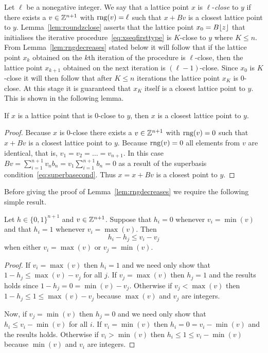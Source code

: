 \documentclass[final,leqno]{siamltex}
\begin{document}
Let $\ell$ be a nonegative integer.  We say that a lattice point $x$ is $\ell$-\emph{close} to $y$ if there exists a $v \in {\mathbb Z}^{n+1}$ with $\operatorname{rng}(v) = \ell$ such that $x + Bv$ is a closest lattice point to $y$.  Lemma~\ref{lem:roundzclose} asserts that the lattice point $x_0 = B{\left\lfloor z \right\rfloor}$ that initialises the iterative procedure~\eqref{eq:xseqfirsttype} is $K$-close to $y$ where $K \leq n$.  From Lemma~\ref{lem:rngdecreases} stated below it will follow that if the lattice point $x_k$ obtained on the $k$th iteration of the procedure is $\ell$-close, then the lattice point $x_{k+1}$ obtained on the next iteration is $(\ell-1)$-close.  Since $x_0$ is $K$-close it will then follow that after $K \leq n$ iterations the lattice point $x_K$ is $0$-close.  At this stage it is guaranteed that $x_{K}$ itself is a closest lattice point to $y$.  This is shown in the following lemma.  

\begin{lemma}\label{lem:rngzeroclosestpoint}
If $x$ is a lattice point that is $0$-close to $y$, then $x$ is a closest lattice point to $y$.
\end{lemma}
\begin{proof}
Because $x$ is $0$-close there exists a $v \in {\mathbb Z}^{n+1}$ with $\operatorname{rng}(v) = 0$ such that $x + Bv$ is a closest lattice point to $y$.  Because $\operatorname{rng}(v) = 0$ all elements from $v$ are identical, that is, $v_1=v_2=\dots=v_{n+1}$.  In this case $Bv = \sum_{i=1}^{n+1} v_n b_n = v_1\sum_{i=1}^{n+1}b_n = 0$
as a result of the superbasis condition~\eqref{eq:superbasecond}.  Thus $x = x + Bv$ is a closest point to $y$. 
\end{proof}

Before giving the proof of Lemma~\ref{lem:rngdecreases} we require the following simple result.

\begin{lemma}\label{eq:integergreaterless}
Let $h \in \{0,1\}^{n+1}$ and $v \in {\mathbb Z}^{n+1}$.  Suppose that
$h_i = 0$ whenever $v_i = \min(v)$ and that $h_i = 1$ whenever $v_i = \max(v)$.  Then
\[
h_i - h_j \leq v_i - v_j
\]
when either $v_i = \max(v)$ or $v_j = \min(v)$.
\end{lemma}
\begin{proof}
If $v_i = \max(v)$ then $h_i = 1$ and we need only show that $1-h_j \leq \max(v) - v_j$ for all $j$.  If $v_j = \max(v)$ then $h_j = 1$ and the results holds since $1 - h_j = 0 = \min(v) - v_j$.  Otherwise if $v_j < \max(v)$ then $1-h_j \leq 1 \leq \max(v) - v_j$ because $\max(v)$ and $v_j$ are integers.

Now, if $v_j = \min(v)$ then $h_j = 0$ and we need only show that $h_i \leq v_i - \min(v)$ for all $i$.  If $v_i = \min(v)$ then $h_i = 0 = v_i - \min(v)$ and the results holds.  Otherwise if $v_i > \min(v)$ then $h_i \leq 1 \leq v_i - \min(v)$ because $\min(v)$ and $v_i$ are integers.
\end{proof}
\end{document}
